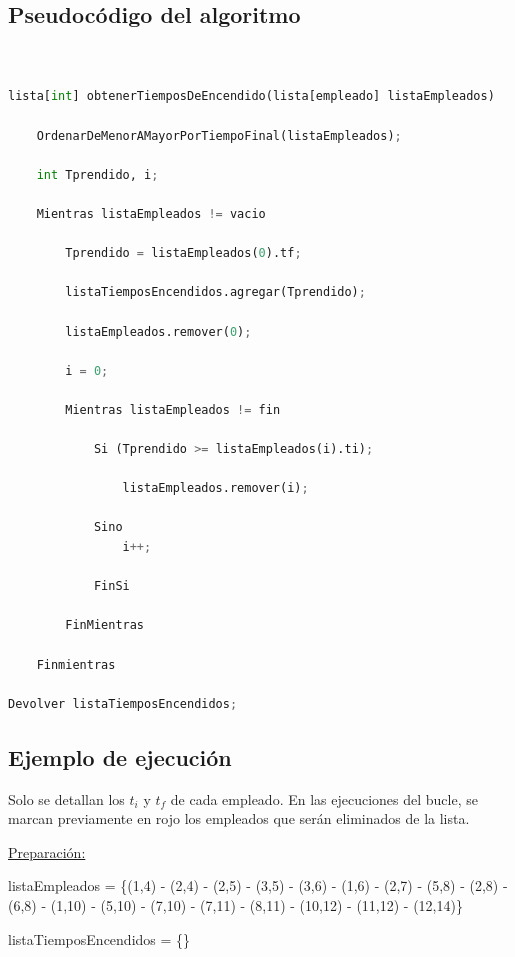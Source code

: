 \documentclass{article}
\begin{document}
\subsection{Pseudocódigo del algoritmo}

\begin{lstlisting}[language=Python, caption=Algoritmo de greddy para Interval Scheduling]

    
lista[int] obtenerTiemposDeEncendido(lista[empleado] listaEmpleados)

    OrdenarDeMenorAMayorPorTiempoFinal(listaEmpleados); 

    int Tprendido, i;

    Mientras listaEmpleados != vacio 

        Tprendido = listaEmpleados(0).tf; 

        listaTiemposEncendidos.agregar(Tprendido);

        listaEmpleados.remover(0); 
        
        i = 0;

        Mientras listaEmpleados != fin 
                
            Si (Tprendido >= listaEmpleados(i).ti); 
            
                listaEmpleados.remover(i); 
                
            Sino
                i++; 

            FinSi

        FinMientras
            
    Finmientras

Devolver listaTiemposEncendidos; 

\end{lstlisting}    


\subsection{Ejemplo de ejecución}

Solo se detallan los \(t_i\) y \(t_f\) de cada empleado. En las ejecuciones del bucle, se marcan previamente en rojo los empleados que serán eliminados de la lista.


\underline{Preparación:}

listaEmpleados = \{(1,4) - (2,4) - (2,5) - (3,5) - (3,6) - (1,6) - (2,7) - (5,8) - (2,8) - (6,8) - (1,10) - (5,10) - (7,10) - (7,11) - (8,11) - (10,12) - (11,12) - (12,14)\}

listaTiemposEncendidos = \{\}
\end{document}

